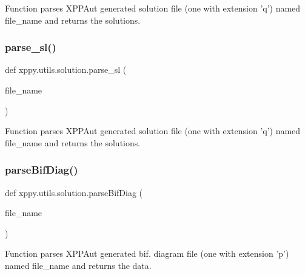\begin{DoxyVerb}Function parses XPPAut generated solution file (one with extension 'q')
named file_name and returns the solutions.
\end{DoxyVerb}
 \mbox{\label{namespacexppy_1_1utils_1_1solution_a1add3df0e71bb9a40388bd75e587ad54}} 
\subsubsection{\texorpdfstring{parse\+\_\+sl()}{parse\_sl()}}
{\footnotesize\ttfamily def xppy.\+utils.\+solution.\+parse\+\_\+sl (\begin{DoxyParamCaption}\item[{}]{file\+\_\+name }\end{DoxyParamCaption})}

\begin{DoxyVerb}Function parses XPPAut generated solution file (one with extension 'q')
named file_name and returns the solutions.
\end{DoxyVerb}
 \mbox{\label{namespacexppy_1_1utils_1_1solution_a37f0231143a38e1a11598985f2d68f91}} 
\subsubsection{\texorpdfstring{parse\+Bif\+Diag()}{parseBifDiag()}}
{\footnotesize\ttfamily def xppy.\+utils.\+solution.\+parse\+Bif\+Diag (\begin{DoxyParamCaption}\item[{}]{file\+\_\+name }\end{DoxyParamCaption})}

\begin{DoxyVerb}Function parses XPPAut generated bif. diagram file (one with extension 'p')
named file_name and returns the data.
\end{DoxyVerb}
 \mbox{\label{namespacexppy_1_1utils_1_1solution_ac3bd329d93694b3603ed350221b06fe6}} 
